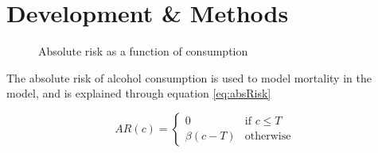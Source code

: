 \chapter{Development \& Methods}


\begin{figure}[H]
\begin{center}
\caption{Absolute risk as a function of consumption}
\label{fig:absRisk}
\end{center}

\end{figure}
The absolute risk of alcohol consumption is used to model mortality in the model, and is explained through equation \ref{eq:absRisk}

\begin{equation}
  AR(c)=
  \begin{cases}
    0 & \text{if } c \leq T \\
    \beta (c-T) & \text{otherwise }
  \end{cases}
  \label{eq:absRisk}
\end{equation}